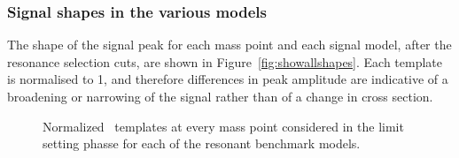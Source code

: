 \clearpage
\subsubsection{Signal shapes in the various models}

The shape of the signal peak for each mass point and each signal model, after the resonance selection cuts, are shown in Figure~\ref{fig:showallshapes}. Each template is normalised to 1, and therefore differences in peak amplitude are indicative of a broadening or narrowing of the signal rather than of a change in cross section.
\begin{figure}[!htb]
\centering
{}
\caption{Normalized \mjj\ templates at every mass point considered in the limit setting phasse for each of the resonant benchmark models. }

\end{figure}

